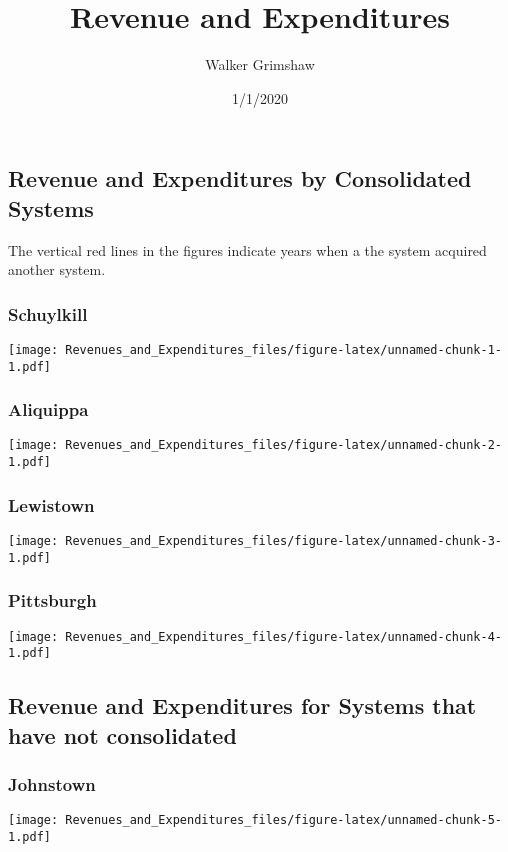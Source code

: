 \documentclass[]{article}
\title{Revenue and Expenditures}
\author{Walker Grimshaw}
\date{1/1/2020}
\begin{document}
\maketitle

\hypertarget{revenue-and-expenditures-by-consolidated-systems}{%
\subsection{Revenue and Expenditures by Consolidated
Systems}\label{revenue-and-expenditures-by-consolidated-systems}}

The vertical red lines in the figures indicate years when a the system
acquired another system.

\hypertarget{schuylkill}{%
\subsubsection{Schuylkill}\label{schuylkill}}

\texttt{[image: Revenues\_and\_Expenditures\_files/figure-latex/unnamed-chunk-1-1.pdf]}

\hypertarget{aliquippa}{%
\subsubsection{Aliquippa}\label{aliquippa}}

\texttt{[image: Revenues\_and\_Expenditures\_files/figure-latex/unnamed-chunk-2-1.pdf]}

\hypertarget{lewistown}{%
\subsubsection{Lewistown}\label{lewistown}}

\texttt{[image: Revenues\_and\_Expenditures\_files/figure-latex/unnamed-chunk-3-1.pdf]}

\hypertarget{pittsburgh}{%
\subsubsection{Pittsburgh}\label{pittsburgh}}

\texttt{[image: Revenues\_and\_Expenditures\_files/figure-latex/unnamed-chunk-4-1.pdf]}

\hypertarget{revenue-and-expenditures-for-systems-that-have-not-consolidated}{%
\subsection{Revenue and Expenditures for Systems that have not
consolidated}\label{revenue-and-expenditures-for-systems-that-have-not-consolidated}}

\hypertarget{johnstown}{%
\subsubsection{Johnstown}\label{johnstown}}

\texttt{[image: Revenues\_and\_Expenditures\_files/figure-latex/unnamed-chunk-5-1.pdf]}
\end{document}
